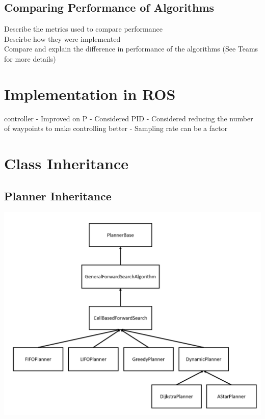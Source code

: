\documentclass[a4paper,12pt]{article}
\begin{document}
			\subsection{Comparing Performance of Algorithms}

		Describe the metrics used to compare performance \\
		Descirbe how they were implemented \\
		Compare and explain the difference in performance of the algorithms (See Teams for more details)


	\section{Implementation in ROS}
	controller 
	- Improved on P
	- Considered PID 
	- Considered reducing the number of waypoints to make controlling better 
	- Sampling rate can be a factor 
	
	\newpage
	
	\appendix
	\appendixpage
	\addappheadtotoc
	\section{Class Inheritance}
	\subsection{Planner Inheritance}
	\label{appendix:planner}
	\includegraphics[scale=0.6]{images/planner_inheritance.png}
\end{document}
